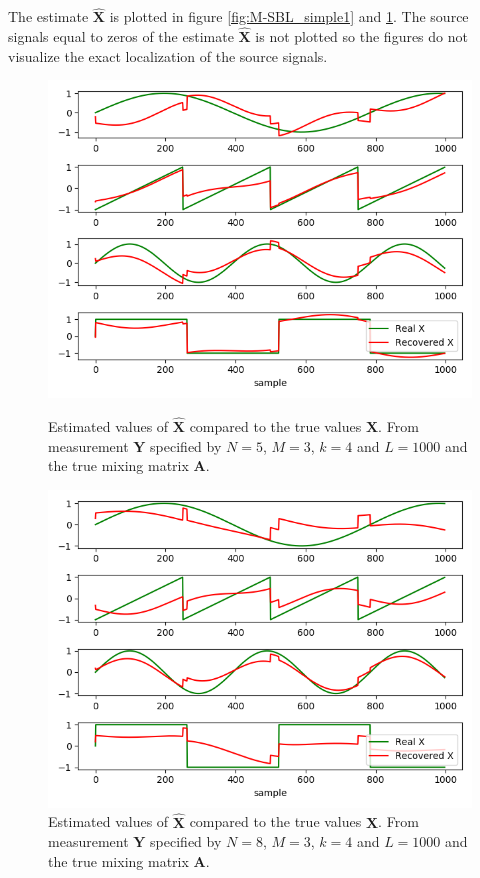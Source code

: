 The estimate $\hat{\mathbf{X}}$ is plotted in figure \ref{fig:M-SBL_simple1} and \ref{fig:M-SBL_simple2}. The source signals equal to zeros of the estimate $\hat{\mathbf{X}}$ is not plotted so the figures do not visualize the exact localization of the source signals.
\begin{figure}[H]
    \begin{minipage}[t]{.45\textwidth}
    	\centering
		\includegraphics[scale=0.45]{figures/ch_6/M-SBL_simple1.png}
		\caption{Estimated values of $\hat{\mathbf{X}}$ compared to the true 					values $\mathbf{X}$. From measurement $\mathbf{Y}$ specified by $N=5$, $M = 3$, $k=4$ and $L=1000$ and the true mixing matrix $\mathbf{A}$.}
		\label{fig:M-SBL_simple1}
    \end{minipage} 
    \hfill
    \begin{minipage}[t]{.45\textwidth}
        \centering
		\includegraphics[scale=0.45]{figures/ch_6/M-SBL_simple2.png}
		\caption{Estimated values of $\hat{\mathbf{X}}$ compared to the true values $\mathbf{X}$. From measurement $\mathbf{Y}$ specified by $N=8$, $M = 3$, $k=4$ and $L=1000$ and the true mixing matrix $\mathbf{A}$.}
		\label{fig:M-SBL_simple2}
    \end{minipage}
\end{figure}
